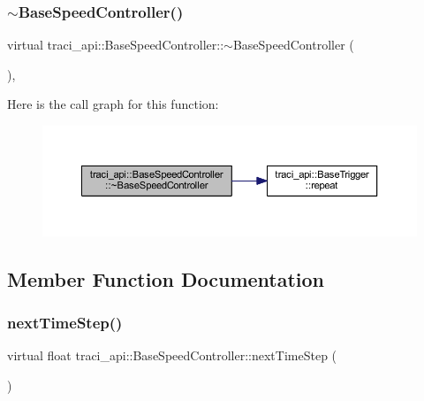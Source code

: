 \subsubsection{\texorpdfstring{$\sim$\+Base\+Speed\+Controller()}{~BaseSpeedController()}}
{\footnotesize\ttfamily virtual traci\+\_\+api\+::\+Base\+Speed\+Controller\+::$\sim$\+Base\+Speed\+Controller (\begin{DoxyParamCaption}{ }\end{DoxyParamCaption})\hspace{0.3cm}{\ttfamily [inline]}, {\ttfamily [virtual]}}

Here is the call graph for this function\+:
\nopagebreak
\begin{figure}[H]
\begin{center}
\leavevmode
\includegraphics[width=350pt]{classtraci__api_1_1_base_speed_controller_a7cabfad7b110f2463c62fe9e1d882043_cgraph}
\end{center}
\end{figure}


\subsection{Member Function Documentation}
\mbox{\label{classtraci__api_1_1_base_speed_controller_ab9658ce36f91de8a34bb710b3241c210}} 
\subsubsection{\texorpdfstring{next\+Time\+Step()}{nextTimeStep()}}
{\footnotesize\ttfamily virtual float traci\+\_\+api\+::\+Base\+Speed\+Controller\+::next\+Time\+Step (\begin{DoxyParamCaption}{ }\end{DoxyParamCaption})\hspace{0.3cm}{\ttfamily [pure virtual]}}



